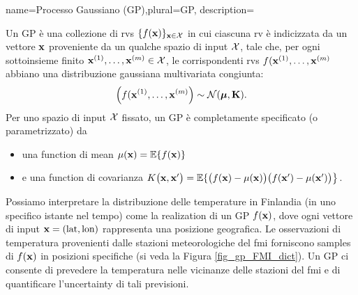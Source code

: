 {name={Processo Gaussiano (GP)},plural={GP},
  description={Un GP è una collezione di \glspl{rv} 
  	$\{f({\bf x})\}_{{\bf x} \in \mathcal{X}}$ in cui ciascuna \gls{rv} è indicizzata 
	da un vettore ${\bf x}$ proveniente da un qualche spazio di input $\mathcal{X}$, 
	tale che, per ogni sottoinsieme finito 
  	${\bf x}^{(1)}, \ldots, {\bf x}^{(m)} \in \mathcal{X}$, 
  	le corrispondenti \glspl{rv} $f({\bf x}^{(1)}, \ldots, {\bf x}^{(m)}$ abbiano una 
	distribuzione gaussiana multivariata congiunta:
  	\[
  	\left( f({\bf x}^{(1)}, \ldots, {\bf x}^{(m)} \right) \sim \mathcal{N}(\boldsymbol{\mu}, \mathbf{K}).
  	\]
  	Per uno spazio di input $\mathcal{X}$ fissato, un GP è 
	completamente specificato (o parametrizzato) da 
  	\begin{itemize}
  		\item una \gls{function} di \gls{mean} $\mu({\bf x}) = \mathbb{E}\{ f({\bf x})\}$
  		\item e una \gls{function} di covarianza $K\big({\bf x},{\bf x}'\big)= \mathbb{E}\{ \big(f({\bf x})-\mu({\bf x})\big) \big(f({\bf x}')-\mu({\bf x}')\big) \big\}$.
  	\end{itemize}
  	 Possiamo interpretare la distribuzione delle temperature in Finlandia (in uno specifico 
	istante nel tempo) come la \gls{realization} di un GP $f({\bf x})$, dove ogni vettore di input 
	${\bf x} = (\text{lat}, \text{lon})$ 
  	rappresenta una posizione geografica. Le osservazioni di temperatura provenienti dalle stazioni 
	meteorologiche del \gls{fmi} forniscono 
  	\glspl{sample} di $f({\bf x})$ in posizioni specifiche (si veda la Figura \ref{fig_gp_FMI_dict}). Un GP ci 
	consente di prevedere la temperatura nelle vicinanze delle stazioni del \gls{fmi} e di quantificare 
	l'\gls{uncertainty} di tali previsioni. 
  	\begin{figure}[H]
  	\begin{center}
\end{center}
\end{figure}}}
